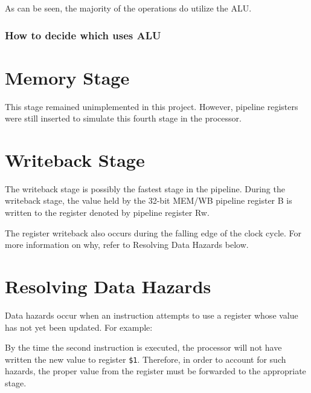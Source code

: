 As can be seen, the majority of the operations do utilize the ALU.

\subsubsection{How to decide which uses
ALU}\label{how-to-decide-which-uses-alu}

\section{Memory Stage}\label{memory-stage}

This stage remained unimplemented in this project. However, pipeline
registers were still inserted to simulate this fourth stage in the
processor.

\section{Writeback Stage}\label{writeback-stage}

The writeback stage is possibly the fastest stage in the pipeline.
During the writeback stage, the value held by the 32-bit MEM/WB pipeline
register B is written to the register denoted by pipeline register Rw.

The register writeback also occurs during the falling edge of the clock
cycle. For more information on why, refer to Resolving Data Hazards
below.

\section{Resolving Data Hazards}\label{resolving-data-hazards}

Data hazards occur when an instruction attempts to use a register whose
value has not yet been updated. For example:

\begin{Shaded}
\begin{Highlighting}[]
 \NormalTok{, }\NormalTok{, }
 \NormalTok{, }\NormalTok{, }
\end{Highlighting}
\end{Shaded}

By the time the second instruction is executed, the processor will not
have written the new value to register \texttt{\$1}. Therefore, in order
to account for such hazards, the proper value from the register must be
forwarded to the appropriate stage.

